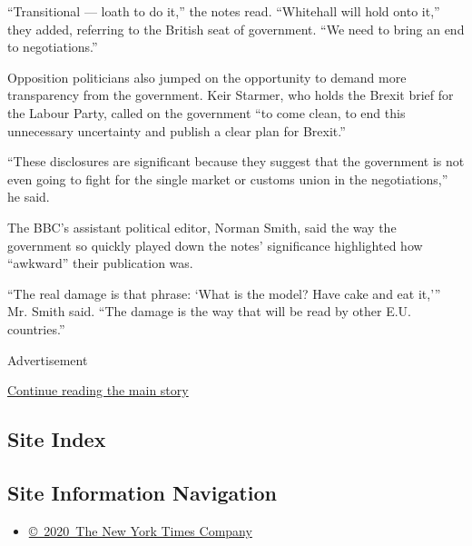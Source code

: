 ``Transitional --- loath to do it,'' the notes read. ``Whitehall will
hold onto it,'' they added, referring to the British seat of government.
``We need to bring an end to negotiations.''

Opposition politicians also jumped on the opportunity to demand more
transparency from the government. Keir Starmer, who holds the Brexit
brief for the Labour Party, called on the government ``to come clean, to
end this unnecessary uncertainty and publish a clear plan for Brexit.''

``These disclosures are significant because they suggest that the
government is not even going to fight for the single market or customs
union in the negotiations,'' he said.

The BBC's assistant political editor, Norman Smith, said the way the
government so quickly played down the notes' significance highlighted
how ``awkward'' their publication was.

``The real damage is that phrase: `What is the model? Have cake and eat
it,''' Mr. Smith said. ``The damage is the way that will be read by
other E.U. countries.''

Advertisement

\protect\hyperlink{after-bottom}{Continue reading the main story}

\hypertarget{site-index}{%
\subsection{Site Index}\label{site-index}}

\hypertarget{site-information-navigation}{%
\subsection{Site Information
Navigation}\label{site-information-navigation}}

\begin{itemize}
\tightlist
\item
  \href{https://help.nytimes.com/hc/en-us/articles/115014792127-Copyright-notice}{©~2020~The
  New York Times Company}
\end{itemize}

